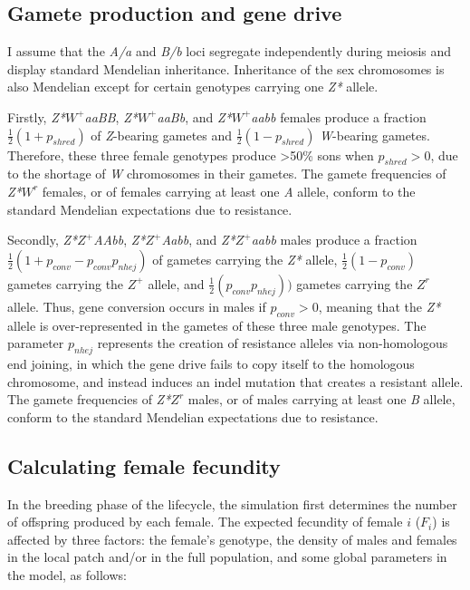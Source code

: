 \documentclass[]{rsos}%
\begin{document}
\hypertarget{gamete-production-and-gene-drive}{%
\subsection{Gamete production and gene
drive}\label{gamete-production-and-gene-drive}}

I assume that the \emph{A/a} and \emph{B/b} loci segregate independently
during meiosis and display standard Mendelian inheritance. Inheritance
of the sex chromosomes is also Mendelian except for certain genotypes
carrying one \emph{Z*} allele.

Firstly, \emph{Z*}\(W^+\)\emph{aaBB}, \emph{Z*}\(W^+\)\emph{aaBb}, and
\emph{Z*}\(W^+\)\emph{aabb} females produce a fraction
\(\frac{1}{2}(1 + p_{shred})\) of \emph{Z}-bearing gametes and
\(\frac{1}{2}(1 - p_{shred})\) \emph{W}-bearing gametes. Therefore,
these three female genotypes produce \textgreater{}50\% sons when
\(p_{shred} > 0\), due to the shortage of \emph{W} chromosomes in their
gametes. The gamete frequencies of \emph{Z*}\(W^r\) females, or of
females carrying at least one \emph{A} allele, conform to the standard
Mendelian expectations due to resistance.

Secondly, \emph{Z*}\(Z^+\)\emph{AAbb}, \emph{Z*}\(Z^+\)\emph{Aabb}, and
\emph{Z*}\(Z^+\)\emph{aabb} males produce a fraction
\(\frac{1}{2}(1 + p_{conv} - p_{conv} p_{nhej})\) of gametes carrying
the \emph{Z*} allele, \(\frac{1}{2}(1 - p_{conv})\) gametes carrying the
\(Z^+\) allele, and \(\frac{1}{2}(p_{conv} p_{nhej}))\) gametes carrying
the \(Z^r\) allele. Thus, gene conversion occurs in males if
\(p_{conv} > 0\), meaning that the \emph{Z*} allele is over-represented
in the gametes of these three male genotypes. The parameter \(p_{nhej}\)
represents the creation of resistance alleles via non-homologous end
joining, in which the gene drive fails to copy itself to the homologous
chromosome, and instead induces an indel mutation that creates a
resistant allele. The gamete frequencies of \emph{Z*}\(Z^r\) males, or
of males carrying at least one \emph{B} allele, conform to the standard
Mendelian expectations due to resistance.

\hypertarget{calculating-female-fecundity}{%
\subsection{Calculating female
fecundity}\label{calculating-female-fecundity}}

In the breeding phase of the lifecycle, the simulation first determines
the number of offspring produced by each female. The expected fecundity
of female \(i\) (\(F_i\)) is affected by three factors: the female's
genotype, the density of males and females in the local patch and/or in
the full population, and some global parameters in the model, as
follows:
\end{document}

